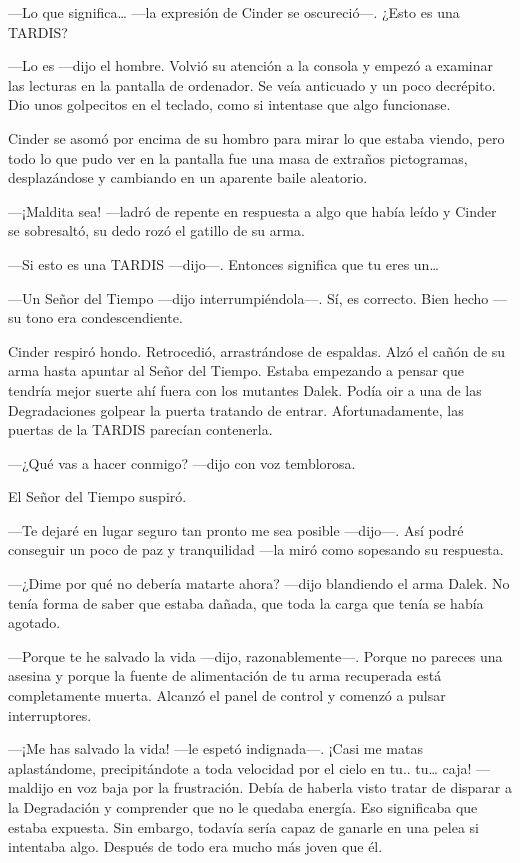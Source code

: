 —Lo que significa… —la expresión de Cinder se oscureció—. ¿Esto es una TARDIS?

—Lo es —dijo el hombre. Volvió su atención a la consola y empezó a examinar las lecturas en la pantalla de ordenador. Se veía anticuado y un poco decrépito. Dio unos golpecitos en el teclado, como si intentase que algo funcionase. 

Cinder se asomó por encima de su hombro para mirar lo que estaba viendo, pero todo lo que pudo ver en la pantalla fue una masa de extraños pictogramas, desplazándose y cambiando en un aparente baile aleatorio. 

—¡Maldita sea! —ladró de repente en respuesta a algo que había leído y Cinder se sobresaltó, su dedo rozó el gatillo de su arma. 

—Si esto es una TARDIS —dijo—. Entonces significa que tu eres un… 

—Un Señor del Tiempo —dijo interrumpiéndola—. Sí, es correcto. Bien hecho —su tono era condescendiente. 

Cinder respiró hondo. Retrocedió, arrastrándose de espaldas. Alzó el cañón de su arma hasta apuntar al Señor del Tiempo. Estaba empezando a pensar que tendría mejor suerte ahí fuera con los mutantes Dalek. Podía oir a una de las Degradaciones golpear la puerta  tratando de entrar. Afortunadamente, las puertas de la TARDIS parecían contenerla. 

—¿Qué vas a hacer conmigo? —dijo con voz temblorosa. 

El Señor del Tiempo suspiró. 

—Te dejaré en lugar seguro tan pronto me sea posible —dijo—. Así podré conseguir un poco de paz y tranquilidad —la miró como sopesando su respuesta. 

—¿Dime por qué no debería matarte ahora? —dijo blandiendo el arma Dalek. No tenía forma de saber que estaba dañada, que toda la carga que tenía se había agotado. 

—Porque te he salvado la vida —dijo, razonablemente—. Porque no pareces una asesina y porque la fuente de alimentación de tu arma recuperada está completamente muerta. Alcanzó el panel de control y comenzó a pulsar interruptores. 

—¡Me has salvado la vida! —le espetó indignada—. ¡Casi me matas aplastándome, precipitándote a toda velocidad por el cielo en tu.. tu… caja! —maldijo en voz baja por la frustración. Debía de haberla visto tratar de disparar a la Degradación y comprender que no le quedaba energía. Eso significaba que estaba expuesta. Sin embargo, todavía sería capaz de ganarle en una pelea si intentaba algo. Después de todo era mucho más joven que él. 

